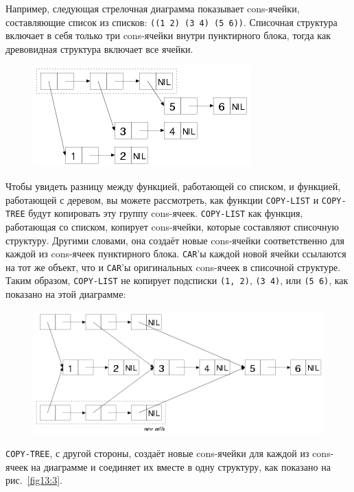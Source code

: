Например, следующая стрелочная диаграмма показывает cons-ячейки, составляющие список из
списков: \lstinline{((1 2) (3 4) (5 6))}. Списочная структура включает в себя только три
cons-ячейки внутри пунктирного блока, тогда как древовидная структура включает все ячейки.

\begin{figure}[h]
  \centering
  \includegraphics[scale=0.6]{images/list-or-tree.png}
\end{figure}

Чтобы увидеть разницу между функцией, работающей со списком, и функцией, работающей с
деревом, вы можете рассмотреть, как функции \lstinline{COPY-LIST} и \lstinline{COPY-TREE} будут
копировать эту группу cons-ячеек. \lstinline{COPY-LIST} как функция, работающая со списком,
копирует cons-ячейки, которые составляют списочную структуру. Другими словами, она создаёт
новые cons-ячейки соответственно для каждой из cons-ячеек пунктирного блока. \lstinline{CAR}'ы
каждой новой ячейки ссылаются на тот же объект, что и \lstinline{CAR}'ы оригинальных cons-ячеек
в списочной структуре. Таким образом, \lstinline{COPY-LIST} не копирует подсписки
\lstinline{(1, 2)}, \lstinline{(3 4)}, или \lstinline{(5 6)}, как показано на этой диаграмме:

\begin{figure}[h]
  \centering
  \includegraphics[scale=0.6]{images/copy-list-list-or-tree.png}
\end{figure}

\lstinline{COPY-TREE}, с другой стороны, создаёт новые cons-ячейки для каждой из cons-ячеек на
диаграмме и соединяет их вместе в одну структуру, как показано на рис.~\ref{fig13:3}.

